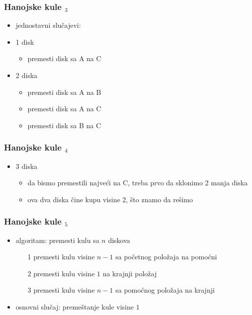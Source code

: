\documentclass[utf8,compress,aspectratio=169]{beamer}
\begin{document}
\begin{frame}[fragile]
  \frametitle{Hanojske kule $_3$}
  \begin{itemize}
    \item jednostavni slučajevi:
    \item 1 disk
  \begin{itemize}
    \item premesti disk sa A na C
  \end{itemize}
    \item 2 diska
  \begin{itemize}
    \item premesti disk sa A na B
    \item premesti disk sa A na C
    \item premesti disk sa B na C
  \end{itemize}
  \end{itemize}
\end{frame}

\begin{frame}[fragile]
  \frametitle{Hanojske kule $_4$}
  \begin{itemize}
    \item 3 diska
  \begin{itemize}
    \item da bismo premestili najveći na C, treba prvo da sklonimo 2 manja diska
    \item ova dva diska čine kupu visine 2, što znamo da rešimo
  \end{itemize}
  \end{itemize}
\end{frame}

\begin{frame}[fragile]
  \frametitle{Hanojske kule $_5$}
  \begin{itemize}
    \item algoritam: premesti kulu sa $n$ diskova
  \begin{itemize}
    \item[1] premesti kulu visine $n-1$ sa početnog položaja na pomoćni
    \item[2] premesti kulu visine $1$ na krajnji položaj
    \item[3] premesti kulu visine $n-1$ sa pomoćnog položaja na krajnji
  \end{itemize}
    \item osnovni slučaj: premeštanje kule visine $1$
  \end{itemize}
\end{frame}
\end{document}
